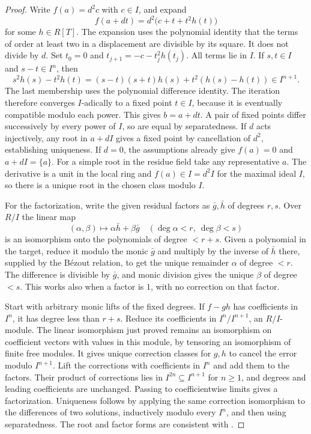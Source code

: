 \documentclass[11pt,oneside,openany]{book}
\theoremstyle{definition}
\theoremstyle{remark}
\begin{document}
\begin{proof}
Write \(f(a)=d^2 c\) with \(c\in I\), and expand
\[
 f(a+d t)=d^2\bigl(c+t+t^2h(t)\bigr)
\]
for some \(h\in R[T]\). The expansion uses the polynomial identity that the terms of order at least two in a displacement are divisible by its square. It does not divide by \(d\). Set \(t_0=0\) and \(t_{j+1}=-c-t_j^2h(t_j)\). All terms lie in \(I\). If \(s,t\in I\) and \(s-t\in I^n\), then
\[
 s^2h(s)-t^2h(t)
 =(s-t)(s+t)h(s)+t^2(h(s)-h(t))\in I^{n+1}.
\]
The last membership uses the polynomial difference identity. The iteration therefore converges \(I\)-adically to a fixed point \(t\in I\), because it is eventually compatible modulo each power. This gives \(b=a+dt\). A pair of fixed points differ successively by every power of \(I\), so are equal by separatedness. If \(d\) acts injectively, any root in \(a+dI\) gives a fixed point by cancellation of \(d^2\), establishing uniqueness. If \(d=0\), the assumptions already give \(f(a)=0\) and \(a+dI=\{a\}\). For a simple root in the residue field take any representative \(a\). The derivative is a unit in the local ring and \(f(a)\in I=d^2I\) for the maximal ideal \(I\), so there is a unique root in the chosen class modulo \(I\).

For the factorization, write the given residual factors as \(\bar g,\bar h\) of degrees \(r,s\). Over \(R/I\) the linear map
\[
 (\alpha,\beta)\longmapsto\alpha\bar h+\beta\bar g
 \quad(\deg\alpha<r,\ \deg\beta<s)
\]
is an isomorphism onto the polynomials of degree \(<r+s\). Given a polynomial in the target, reduce it modulo the monic \(\bar g\) and multiply by the inverse of \(\bar h\) there, supplied by the Bézout relation, to get the unique remainder \(\alpha\) of degree \(<r\). The difference is divisible by \(\bar g\), and monic division gives the unique \(\beta\) of degree \(<s\). This works also when a factor is \(1\), with no correction on that factor.

Start with arbitrary monic lifts of the fixed degrees. If \(f-gh\) has coefficients in \(I^n\), it has degree less than \(r+s\). Reduce its coefficients in \(I^n/I^{n+1}\), an \(R/I\)-module. The linear isomorphism just proved remains an isomorphism on coefficient vectors with values in this module, by tensoring an isomorphism of finite free modules. It gives unique correction classes for \(g,h\) to cancel the error modulo \(I^{n+1}\). Lift the corrections with coefficients in \(I^n\) and add them to the factors. Their product of corrections lies in \(I^{2n}\subseteq I^{n+1}\) for \(n\ge1\), and degrees and leading coefficients are unchanged. Passing to coefficientwise limits gives a factorization. Uniqueness follows by applying the same correction isomorphism to the differences of two solutions, inductively modulo every \(I^n\), and then using separatedness. The root and factor forms are consistent with \cite[Theorem 7.3 and Exercises 7.20--7.22]{eisenbud}.
\end{proof}
\end{document}
